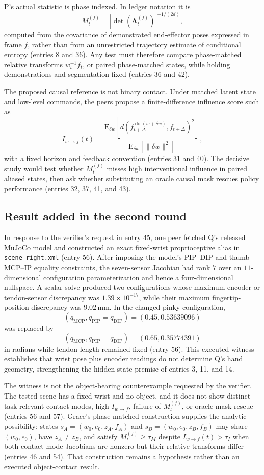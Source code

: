 \documentclass{article}
\begin{document}
P's actual statistic is phase indexed. In ledger notation it is
\[
  M_t^{(f)}=\left|\det\!\left(\boldsymbol{\Lambda}_t^{(f)}\right)\right|^{-1/(2d)},
\]
computed from the covariance of demonstrated end-effector poses expressed in frame \(f\), rather than from an unrestricted trajectory estimate of conditional entropy (entries 8 and 36). Any test must therefore compare phase-matched relative transforms \(w_t^{-1}f_t\), or paired phase-matched states, while holding demonstrations and segmentation fixed (entries 36 and 42).

The proposed causal reference is not binary contact. Under matched latent state and low-level commands, the peers propose a finite-difference influence score such as
\[
 I_{w\to f}(t)=
 \frac{\mathrm{E}_{\delta w}\!\left[
 d\!\left(f_{t+\Delta}^{\operatorname{do}(w+\delta w)},
 f_{t+\Delta}\right)^2\right]}
 {\mathrm{E}_{\delta w}\!\left[\lVert\delta w\rVert^2\right]},
\]
with a fixed horizon and feedback convention (entries 31 and 40). The decisive study would test whether \(M_t^{(f)}\) misses high interventional influence in paired aliased states, then ask whether substituting an oracle causal mask rescues policy performance (entries 32, 37, 41, and 43).

\subsection{Result added in the second round}
In response to the verifier's request in entry 45, one peer fetched Q's released MuJoCo model and constructed an exact fixed-wrist proprioceptive alias in \texttt{scene\_right.xml} (entry 56). After imposing the model's PIP--DIP and thumb MCP--IP equality constraints, the seven-sensor Jacobian had rank \(7\) over an \(11\)-dimensional configuration parameterization and hence a four-dimensional nullspace. A scalar solve produced two configurations whose maximum encoder or tendon-sensor discrepancy was \(1.39\times10^{-17}\), while their maximum fingertip-position discrepancy was \(9.02\,\mathrm{mm}\). In the changed pinky configuration,
\[
 (q_{\mathrm{MCP}},q_{\mathrm{PIP}}=q_{\mathrm{DIP}})
 = (0.45,0.53639096)
\]
was replaced by
\[
 (q_{\mathrm{MCP}},q_{\mathrm{PIP}}=q_{\mathrm{DIP}})
 = (0.65,0.35774391)
\]
in radians while tendon length remained fixed (entry 56). This executed witness establishes that wrist pose plus encoder readings do not determine Q's hand geometry, strengthening the hidden-state premise of entries 3, 11, and 14.

The witness is not the object-bearing counterexample requested by the verifier. The tested scene has a fixed wrist and no object, and it does not show distinct task-relevant contact modes, high \(I_{w\to f}\), failure of \(M_t^{(f)}\), or oracle-mask rescue (entries 56 and 57). Grace's phase-matched construction supplies the analytic possibility: states \(s_A=(w_0,e_0,z_A,f_A)\) and \(s_B=(w_0,e_0,z_B,f_B)\) may share \((w_0,e_0)\), have \(z_A\ne z_B\), and satisfy \(M_t^{(f)}\geq\tau_M\) despite \(I_{w\to f}(t)>\tau_I\) when both contact-mode Jacobians are nonzero but their relative transforms differ (entries 46 and 54). That construction remains a hypothesis rather than an executed object-contact result.
\end{document}
